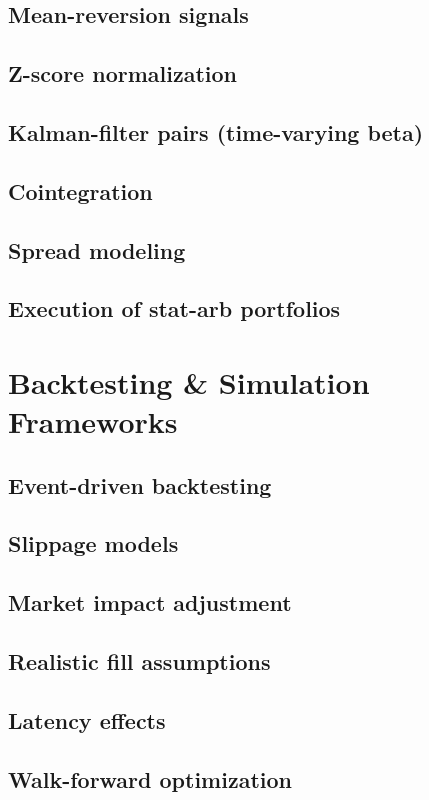 \documentclass{report}
\begin{document}
\subsection*{Mean-reversion signals}
\subsection*{Z-score normalization}
\subsection*{Kalman-filter pairs (time-varying beta)}
\subsection*{Cointegration}
\subsection*{Spread modeling}
\subsection*{Execution of stat-arb portfolios}

\section{Backtesting \& Simulation Frameworks}
\subsection*{Event-driven backtesting}
\subsection*{Slippage models}
\subsection*{Market impact adjustment}
\subsection*{Realistic fill assumptions}
\subsection*{Latency effects}
\subsection*{Walk-forward optimization}
\end{document}
